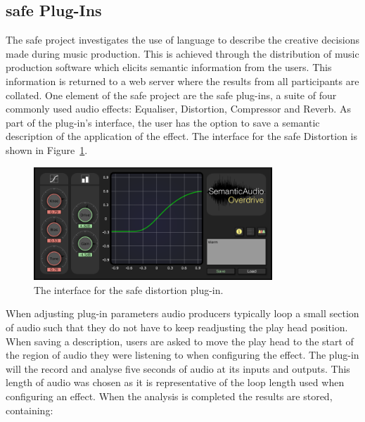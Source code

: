 	\subsection{\acrshort{safe} Plug-Ins}
	\label{sec:TimbreEvaluation-DAWBasedTimbreEvaluation-SAFE}
		The \acrshort{safe} project \citep{stables2014safe} investigates the use of language to describe the
		creative decisions made during music production. This is achieved through the distribution of music
		production software which elicits semantic information from the users. This information is returned to a
		web server where the results from all participants are collated. One element of the \acrshort{safe} project
		are the \acrshort{safe} plug-ins, a suite of four commonly used audio effects: Equaliser, Distortion,
		Compressor and Reverb. As part of the plug-in's interface, the user has the option to save a semantic
		description of the application of the effect. The interface for the \acrshort{safe} Distortion is shown in
		Figure~\ref{fig:SAFE-Distortion}.

		\begin{figure}[h!]
			\centering
			\includegraphics[width=0.8\textwidth]{chapter4/Images/SAFEDistortion.png}
			\caption{The interface for the \acrshort{safe} distortion plug-in.}
			\label{fig:SAFE-Distortion}
		\end{figure}
		
		When adjusting plug-in parameters audio producers typically loop a small section of audio such that they do
		not have to keep readjusting the play head position. When saving a description, users are asked to move the
		play head to the start of the region of audio they were listening to when configuring the effect. The
		plug-in will the record and analyse five seconds of audio at its inputs and outputs. This length of audio
		was chosen as it is representative of the loop length used when configuring an effect. When the analysis is
		completed the results are stored, containing:


